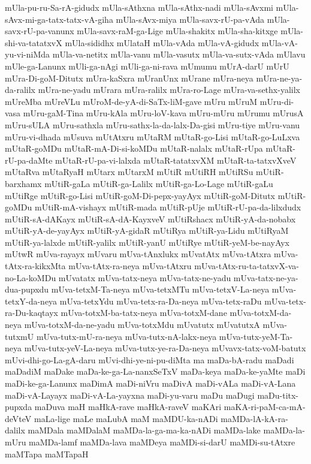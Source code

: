 {mUla-pu-ru-Sa-rA-gidudx
mUla-sAthxna
mUla-sAthx-nadi
mUla-sAvxmi
mUla-sAvx-mi-ga-tatx-tatx-vA-giha
mUla-sAvx-miya
mUla-savx-rU-pa-vAda
mUla-savx-rU-pa-vanunx
mUla-savx-raM-ga-Lige
mUla-shakitx
mUla-sha-kitxge
mUla-shi-va-tatatxvX
mUla-sididhx
mUlataH
mUla-vAda
mUla-vA-gidudx
mUla-vA-yu-vi-niMda
mUla-va-netitx
mUla-vanu
mUla-vasutx
mUla-va-sutx-vAda
mUlavu
mUle-ga-Lanunx
mUli-ga-nAgi
mUli-ga-ni-rava
mUmumu
mUrA-darU
mUrU
mUra-Di-goM-Ditutx
mUra-kaSxra
mUranUnx
mUrane
mUra-neya
mUra-ne-ya-da-ralilx
mUra-ne-yadu
mUrara
mUra-ralilx
mUra-ro-Lage
mUra-va-sethx-yalilx
mUreMba
mUreVLu
mUroM-de-yA-di-SaTx-liM-gave
mUru
mUruM
mUru-di-vasa
mUru-gaM-Tina
mUru-kAla
mUru-loV-kava
mUru-mUru
mUrumu
mUrusA
mUru-sULA
mUru-sathxla
mUru-sathx-la-da-lalx-Da-gisi
mUru-tiye
mUru-vanu
mUru-vi-dhada
mUsuva
mUtAtxru
mUtaRM
mUtaR-go-Lisi
mUtaR-go-LuLxva
mUtaR-goMDu
mUtaR-mA-Di-si-koMDu
mUtaR-nalalx
mUtaR-rUpa
mUtaR-rU-pa-daMte
mUtaR-rU-pa-vi-lalxda
mUtaR-tatatxvXM
mUtaR-ta-tatxvXveV
mUtaRva
mUtaRyaH
mUtarx
mUtarxM
mUtiR
mUtiRH
mUtiRSu
mUtiR-barxhamx
mUtiR-gaLa
mUtiR-ga-Lalilx
mUtiR-ga-Lo-Lage
mUtiR-gaLu
mUtiRge
mUtiR-go-Lisi
mUtiR-goM-Di-pepx-yayAyx
mUtiR-goM-Ditutx
mUtiR-goMDu
mUtiR-mA-vishayx
mUtiR-mada
mUtiR-pUje
mUtiR-rU-pa-da-lilxdudx
mUtiR-sA-dAKayx
mUtiR-sA-dA-KayxveV
mUtiRshacx
mUtiR-yA-da-nobabx
mUtiR-yA-de-yayAyx
mUtiR-yA-gidaR
mUtiRya
mUtiR-ya-Lidu
mUtiRyaM
mUtiR-ya-lalxde
mUtiR-yalilx
mUtiR-yanU
mUtiRye
mUtiR-yeM-be-nayAyx
mUtwR
mUva-rayayx
mUvaru
mUva-tAnxlukx
mUvatAtx
mUva-tAtxra
mUva-tAtx-ra-kikxMta
mUva-tAtx-ra-neya
mUva-tAtxru
mUva-tAtx-ru-ta-tatxvX-va-no-La-koMDu
mUvatatx
mUva-tatx-neya
mUva-tatx-ne-yadu
mUva-tatx-ne-ya-dua-pupxdu
mUva-tetxM-Ta-neya
mUva-tetxMTu
mUva-tetxV-La-neya
mUva-tetxY-da-neya
mUva-tetxYdu
mUva-tetx-ra-Da-neya
mUva-tetx-raDu
mUva-tetx-ra-Du-kaqtayx
mUva-totxM-ba-tatx-neya
mUva-totxM-dane
mUva-totxM-da-neya
mUva-totxM-da-ne-yadu
mUva-totxMdu
mUvatutx
mUvatutxA
mUva-tutxmU
mUva-tutx-mU-ra-neya
mUva-tutx-nA-lakx-neya
mUva-tutx-yeM-Ta-neya
mUva-tutx-yeV-La-neya
mUva-tutx-ye-ra-Da-neya
mUvavx-tatx-voM-batutx
mUvi-dhi-go-La-gA-daru
mUvi-dhi-ye-ni-pu-diMta
ma
maDa-bA-radu
maDadi
maDadiM
maDake
maDa-ke-ga-La-nanxSeTxV
maDa-keya
maDa-ke-yaMte
maDi
maDi-ke-ga-Lanunx
maDimA
maDi-niVru
maDivA
maDi-vALa
maDi-vA-Lana
maDi-vA-Layayx
maDi-vA-La-yayxna
maDi-yu-varu
maDu
maDugi
maDu-titx-pupxda
maDuva
maH
maHkA-rave
maHkA-raveV
maKAri
maKA-ri-paM-ca-mA-deVteV
maLa-lige
maLe
maLubA
maM
maMDU-ka-nADi
maMDa-lA-kA-ra-dalilx
maMDala
maMDalaM
maMDa-la-ga-ma-ka-nADi
maMDa-lake
maMDa-la-mUru
maMDa-lamf
maMDa-lava
maMDeya
maMDi-si-darU
maMDi-su-tAtxre
maMTapa
maMTapaH
}
